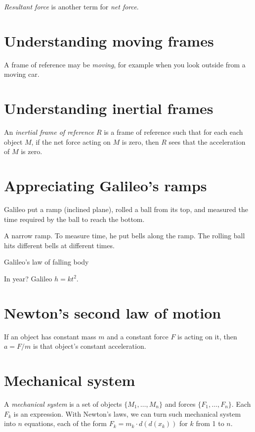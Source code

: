 \emph{Resultant force} is another term for \emph{net force}.

\section{Understanding moving frames}

A frame of reference may be \emph{moving},
for example when you look outside from a moving car.

\section{Understanding inertial frames}

An \emph{inertial frame of reference} \(R\) is a frame of reference such that
for each each object \( M \), if the net force acting on \( M \) is zero, then \(R\) sees that the acceleration of \(M\) is zero.

\section{Appreciating Galileo's ramps}

Galileo put a ramp (inclined plane),
rolled a ball from its top,
and measured the time required by the ball to reach the bottom.

A narrow ramp.
To measure time, he put bells along the ramp.
The rolling ball hits different bells at different times.

Galileo's law of falling body

In year? Galileo \( h = k t^2 \).

\section{Newton's second law of motion}

If an object has constant mass \( m \) and a constant force \( F \) is acting on it,
then \( a = F/m \) is that object's constant acceleration.

\section{Mechanical system}

A \emph{mechanical system} is a set of objects \( \{ M_1,\ldots,M_n \} \) and forces \( \{ F_1,\ldots,F_n \} \).
Each \(F_k\) is an expression.
With Newton's laws, we can turn such mechanical system into \(n\) equations,
each of the form \( F_k = m_k \cdot d(d(x_k)) \) for \(k\) from 1 to \(n\).

